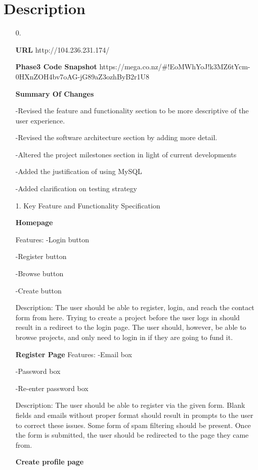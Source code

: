 \documentclass[12pt]{article}
\begin{document}
\section*{Description}
\begin{enumerate}

\item[0.]

\textbf{URL}
http://104.236.231.174/

\textbf{Phase3 Code Snapshot}
https://mega.co.nz/#!EoMWhYoJ!k3MZ6tYcm-0HXnZOH4bv7oAG-jG89aZ3ozhByB2r1U8

\textbf{Summary Of Changes}

-Revised the feature and functionality section to be more descriptive of the user experience.

-Revised the software architecture section by adding more detail.

-Altered the project milestones section in light of current developments

-Added the justification of using MySQL

-Added clarification on testing strategy



\item[1.] Key Feature and Functionality Specification

\textbf{Homepage}

Features:
-Login button

-Register button

-Browse button

-Create button

Description: The user should be able to register, login, and reach the contact form from here.
Trying to create a project before the user logs in should result in a redirect to the login page.
The user should, however, be able to browse projects, and only need to login in if they are going to fund it.

\textbf{Register Page}
Features:
-Email box

-Password box

-Re-enter password box

Description:
The user should be able to register via the given form.
Blank fields and emails without proper format should result in prompts to the user to correct these issues.
Some form of spam filtering should be present.
Once the form is submitted, the user should be redirected to the page they came from.

\textbf{Create profile page}


\end{enumerate}
\end{document}
